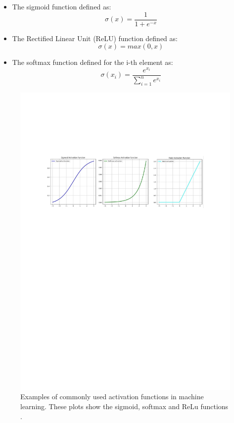 \begin{itemize}
    \item The sigmoid function defined as:
    \begin{equation}
        \sigma(x)=\frac{1}{1+e^{-x}}
    \end{equation}
    \item The Rectified Linear Unit (ReLU) function defined as:
    \begin{equation}
        \sigma(x)=max(0,x)
    \end{equation}
    \item The softmax function defined for the i-th element as:
    \begin{equation}
        \sigma(x_i)=\frac{e^{x_i}}{\sum_{i=1}^n e^{x_i}}
    \label{eq: activation function}
        \end{equation}
\end{itemize}

\begin{figure}[hbt]
    \centering
    \includegraphics[width=0.7\linewidth]{Images/5.SPANet/Activation function 2.pdf}
    \caption{Examples of commonly used activation functions in machine learning. These plots show the sigmoid, softmax and ReLu functions \cite{figactivf}.}
    \label{fig: activation function}
\end{figure}

